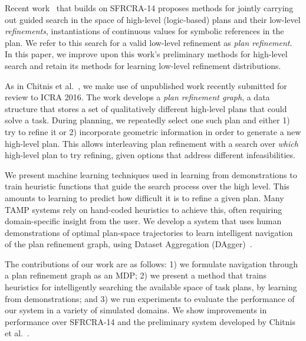 Recent work~\cite{chitnis2015mlpc} that builds on SFRCRA-14 proposes
methods for jointly carrying out guided search in the space of
high-level (logic-based) plans and their low-level
\emph{refinements}, instantiations of continuous values for
symbolic references in the plan. We refer to this search for a valid low-level
refinement as \emph{plan refinement}. In this paper, we improve upon
this work's preliminary methods for high-level search and retain its methods
for learning low-level refinement distributions.

As in Chitnis et al.~\cite{chitnis2015mlpc}, we make use of unpublished work
recently submitted for review to ICRA 2016. The work develops
a \emph{plan refinement graph}, a data structure that stores a
set of qualitatively different high-level plans that could solve a task.
During planning, we repeatedly select one such plan and either 1) try to
refine it or 2) incorporate geometric information in order to generate a new high-level
plan. This allows interleaving plan refinement with a
search over \emph{which} high-level plan to try refining, given options
that address different infeasibilities.

We present machine learning techniques used in learning from demonstrations
to train heuristic functions that guide the search process over the high level.
This amounts to learning to predict how difficult it is to refine a given plan.
Many TAMP systems rely on hand-coded heuristics to achieve this, often requiring
domain-specific insight from the user. We develop a system that uses human
demonstrations of optimal plan-space trajectories to learn intelligent navigation
of the plan refinement graph, using Dataset Aggregation (DAgger)~\cite{ross2010dagger}.

The contributions of our work are as follows: 1) we formulate navigation through a plan
refinement graph as an MDP; 2) we present a method that trains
heuristics for intelligently searching the available space of task plans, by learning
from demonstrations; and 3) we run experiments to evaluate the performance of our system in a
variety of simulated domains. We show improvements in performance over SFRCRA-14
and the preliminary system developed by Chitnis et al.~\cite{chitnis2015mlpc}.
